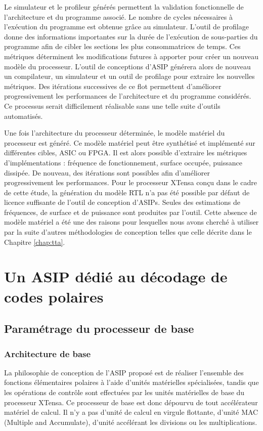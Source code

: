 Le simulateur et le profileur générés permettent la validation fonctionnelle de l'architecture et du programme associé. Le nombre de cycles nécessaires à l'exécution du programme est obtenue grâce au simulateur. L'outil de profilage donne des informations importantes sur la durée de l'exécution de sous-parties du programme afin de cibler les sections les plus consommatrices de temps. Ces métriques déterminent les modifications futures à apporter pour créer un nouveau modèle du processeur. L'outil de conceptions d'ASIP générera alors de nouveau un compilateur, un simulateur et un outil de profilage pour extraire les nouvelles métriques. Des itérations successives de ce flot permettent d'améliorer progressivement les performances de l'architecture et du programme considérés. Ce processus serait difficilement réalisable sans une telle suite d'outils automatisés.

Une fois l'architecture du processeur déterminée, le modèle matériel du processeur est généré. Ce modèle matériel peut être synthétisé et implémenté sur différentes cibles, ASIC ou FPGA. Il est alors possible d'extraire les métriques d'implémentations : fréquence de fonctionnement, surface occupée, puissance dissipée. De nouveau, des itérations sont possibles afin d'améliorer progressivement les performances.
Pour le processeur XTensa conçu dans le cadre de cette étude, la génération du modèle RTL n'a pas été possible par défaut de licence suffisante de l'outil de conception d'ASIPs. Seules des estimations de fréquences, de surface et de puissance sont produites par l'outil. Cette absence de modèle matériel a été une des raisons pour lesquelles nous avons cherché à utiliser par la suite d'autres méthodologies de conception telles que celle décrite dans le Chapitre \ref{chap:tta}.

\section{Un ASIP dédié au décodage de codes polaires}
\label{sec:tensilica_design}
\subsection{Paramétrage du processeur de base}
\subsubsection{Architecture de base}
La philosophie de conception de l'ASIP proposé est de réaliser l'ensemble des fonctions élémentaires polaires à l'aide d'unités matérielles spécialisées, tandis que les opérations de contrôle sont effectuées par les unités matérielles de base du processeur XTensa. Ce processeur de base est donc dépourvu de tout accélérateur matériel de calcul. Il n'y a pas d'unité de calcul en virgule flottante, d'unité MAC (Multiple and Accumulate), d'unité accélérant les divisions ou les multiplications.

